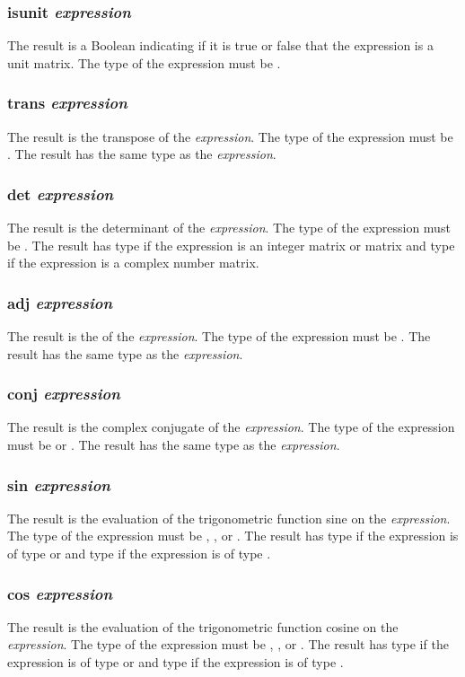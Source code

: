 \subsubsection{isunit \textit{expression}}
The result is a Boolean indicating if it is true or false that the expression is a unit matrix. The type of the expression must be \mat.
\subsubsection{trans \textit{expression}}
The result is the transpose of the \textit{expression}. The type of the expression must be \mat. The result has the same type as the \textit{expression}.
\subsubsection{det \textit{expression}}
The result is the determinant of the \textit{expression}. The type of the expression must be \mat. The result has type \float if the expression is an integer matrix or \float matrix and type \complex if the expression is a complex number matrix.
\subsubsection{adj \textit{expression}}
The result is the  of the \textit{expression}. The type of the expression must be \mat. The result has the same type as the \textit{expression}.
\subsubsection{conj \textit{expression}}
The result is the complex conjugate of the \textit{expression}. The type of the expression must be \complex or \mat. The result has the same type as the \textit{expression}.
\subsubsection{sin \textit{expression}}
The result is the evaluation of the trigonometric function sine on the \textit{expression}. The type of the expression must be \integ, \float, or  \complex. The result has type \float if the expression is of type \integ or \float and type \complex if the expression is of type  \complex.
\subsubsection{cos \textit{expression}}
The result is the evaluation of the trigonometric function cosine on the \textit{expression}. The type of the expression must be \integ, \float, or  \complex. The result has type \float if the expression is of type \integ or \float and type \complex if the expression is of type  \complex.
